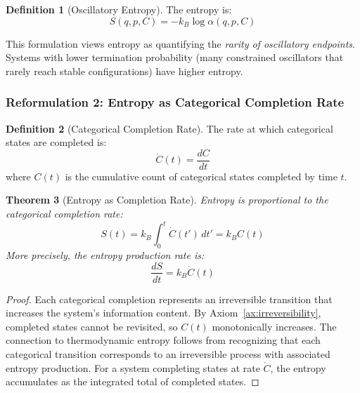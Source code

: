 \documentclass[superscriptaddress,prb,10pt]{revtex4-2}
\newtheorem{theorem}{Theorem}
\theoremstyle{definition}
\newtheorem{definition}[theorem]{Definition}
\theoremstyle{remark}
\begin{document}
\begin{definition}[Oscillatory Entropy]
\label{def:entropy}
The entropy is:
\begin{equation}
S(q,p,C) = -k_B \log \alpha(q,p,C)
\label{eq:oscillatory_entropy}
\end{equation}
\end{definition}

This formulation views entropy as quantifying the \emph{rarity of oscillatory endpoints}. Systems with lower termination probability (many constrained oscillators that rarely reach stable configurations) have higher entropy.

\subsubsection{Reformulation 2: Entropy as Categorical Completion Rate}

\begin{definition}[Categorical Completion Rate]
\label{def:completion_rate}
The rate at which categorical states are completed is:
\begin{equation}
\dot{C}(t) = \frac{dC}{dt}
\label{eq:completion_rate}
\end{equation}
where $C(t)$ is the cumulative count of categorical states completed by time $t$.
\end{definition}

\begin{theorem}[Entropy as Completion Rate]
\label{thm:entropy_rate}
Entropy is proportional to the categorical completion rate:
\begin{equation}
S(t) = k_B \int_0^t \dot{C}(t') \, dt' = k_B C(t)
\label{eq:entropy_completion_rate}
\end{equation}
More precisely, the entropy production rate is:
\begin{equation}
\frac{dS}{dt} = k_B \dot{C}(t)
\label{eq:entropy_production_rate}
\end{equation}
\end{theorem}

\begin{proof}
Each categorical completion represents an irreversible transition that increases the system's information content. By Axiom~\ref{ax:irreversibility}, completed states cannot be revisited, so $C(t)$ monotonically increases. The connection to thermodynamic entropy follows from recognizing that each categorical transition corresponds to an irreversible process with associated entropy production. For a system completing states at rate $\dot{C}$, the entropy accumulates as the integrated total of completed states.
\end{proof}
\end{document}

